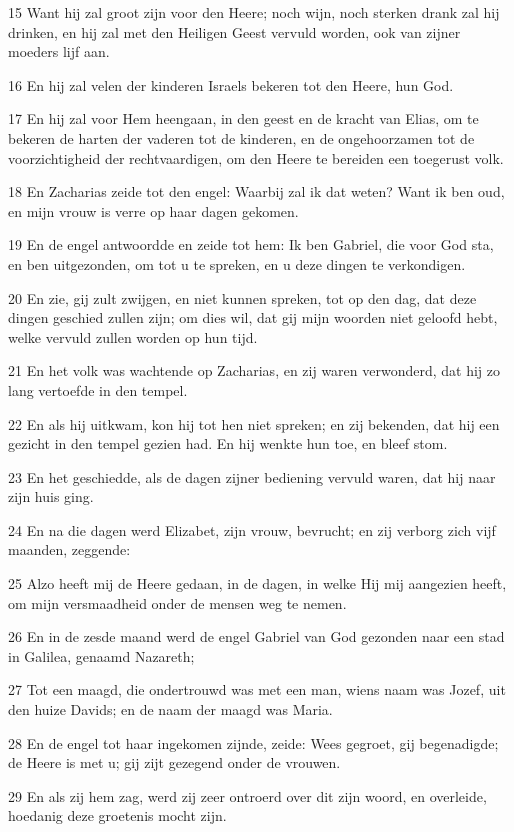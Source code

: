 \par 15 Want hij zal groot zijn voor den Heere; noch wijn, noch sterken drank zal hij drinken, en hij zal met den Heiligen Geest vervuld worden, ook van zijner moeders lijf aan.
\par 16 En hij zal velen der kinderen Israels bekeren tot den Heere, hun God.
\par 17 En hij zal voor Hem heengaan, in den geest en de kracht van Elias, om te bekeren de harten der vaderen tot de kinderen, en de ongehoorzamen tot de voorzichtigheid der rechtvaardigen, om den Heere te bereiden een toegerust volk.
\par 18 En Zacharias zeide tot den engel: Waarbij zal ik dat weten? Want ik ben oud, en mijn vrouw is verre op haar dagen gekomen.
\par 19 En de engel antwoordde en zeide tot hem: Ik ben Gabriel, die voor God sta, en ben uitgezonden, om tot u te spreken, en u deze dingen te verkondigen.
\par 20 En zie, gij zult zwijgen, en niet kunnen spreken, tot op den dag, dat deze dingen geschied zullen zijn; om dies wil, dat gij mijn woorden niet geloofd hebt, welke vervuld zullen worden op hun tijd.
\par 21 En het volk was wachtende op Zacharias, en zij waren verwonderd, dat hij zo lang vertoefde in den tempel.
\par 22 En als hij uitkwam, kon hij tot hen niet spreken; en zij bekenden, dat hij een gezicht in den tempel gezien had. En hij wenkte hun toe, en bleef stom.
\par 23 En het geschiedde, als de dagen zijner bediening vervuld waren, dat hij naar zijn huis ging.
\par 24 En na die dagen werd Elizabet, zijn vrouw, bevrucht; en zij verborg zich vijf maanden, zeggende:
\par 25 Alzo heeft mij de Heere gedaan, in de dagen, in welke Hij mij aangezien heeft, om mijn versmaadheid onder de mensen weg te nemen.
\par 26 En in de zesde maand werd de engel Gabriel van God gezonden naar een stad in Galilea, genaamd Nazareth;
\par 27 Tot een maagd, die ondertrouwd was met een man, wiens naam was Jozef, uit den huize Davids; en de naam der maagd was Maria.
\par 28 En de engel tot haar ingekomen zijnde, zeide: Wees gegroet, gij begenadigde; de Heere is met u; gij zijt gezegend onder de vrouwen.
\par 29 En als zij hem zag, werd zij zeer ontroerd over dit zijn woord, en overleide, hoedanig deze groetenis mocht zijn.
